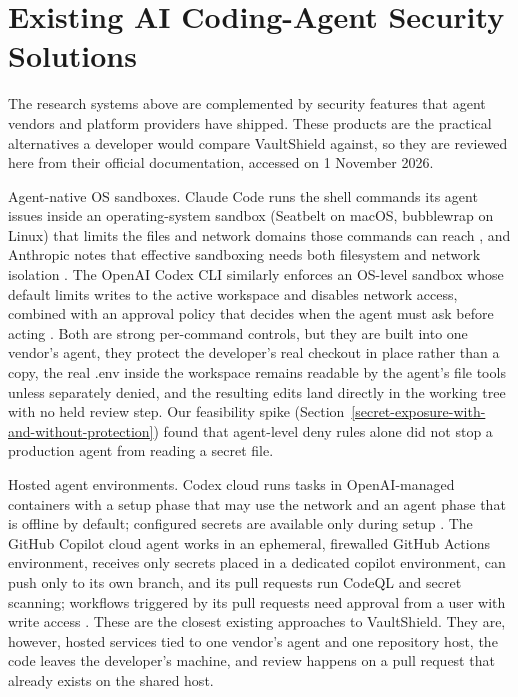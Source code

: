 \documentclass[12pt,a4paper,oneside]{report}
\makeatletter
\newcommand{\InsertBase}{0}
\newcommand{\BeginInsertPages}[1]{%
  \renewcommand{\InsertBase}{#1}%
  \renewcommand{\thepage}{\ifnum\value{page}>\InsertBase\relax\InsertBase\@alph{\numexpr\value{page}-\InsertBase\relax}\else\arabic{page}\fi}}
\makeatother
\begin{document}
\addtocounter{table}{-1}
\par\medskip

\endgroup

\clearpage
\BeginInsertPages{7}
\section{Existing AI Coding-Agent Security Solutions}\label{existing-agent-security-solutions}

The research systems above are complemented by security features that agent vendors and platform providers have shipped. These products are the practical alternatives a developer would compare VaultShield against, so they are reviewed here from their official documentation, accessed on 1 November 2026.

Agent-native OS sandboxes. Claude Code runs the shell commands its agent issues inside an operating-system sandbox (Seatbelt on macOS, bubblewrap on Linux) that limits the files and network domains those commands can reach \cite{ref16}, and Anthropic notes that effective sandboxing needs both filesystem and network isolation \cite{ref17}. The OpenAI Codex CLI similarly enforces an OS-level sandbox whose default limits writes to the active workspace and disables network access, combined with an approval policy that decides when the agent must ask before acting \cite{ref18}. Both are strong per-command controls, but they are built into one vendor's agent, they protect the developer's real checkout in place rather than a copy, the real .env inside the workspace remains readable by the agent's file tools unless separately denied, and the resulting edits land directly in the working tree with no held review step. Our feasibility spike (Section~\ref{secret-exposure-with-and-without-protection}) found that agent-level deny rules alone did not stop a production agent from reading a secret file.

Hosted agent environments. Codex cloud runs tasks in OpenAI-managed containers with a setup phase that may use the network and an agent phase that is offline by default; configured secrets are available only during setup \cite{ref18}. The GitHub Copilot cloud agent works in an ephemeral, firewalled GitHub Actions environment, receives only secrets placed in a dedicated copilot environment, can push only to its own branch, and its pull requests run CodeQL and secret scanning; workflows triggered by its pull requests need approval from a user with write access \cite{ref19}. These are the closest existing approaches to VaultShield. They are, however, hosted services tied to one vendor's agent and one repository host, the code leaves the developer's machine, and review happens on a pull request that already exists on the shared host.
\end{document}
